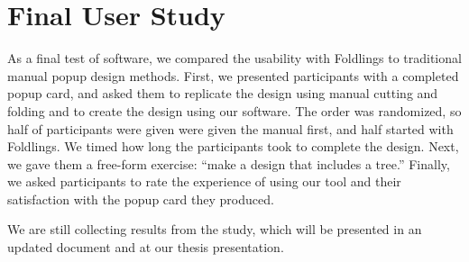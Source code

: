 \section{Final User Study}\label{final-user-study}

As a final test of software, we compared the usability with Foldlings to
traditional manual popup design methods. First, we presented
participants with a completed popup card, and asked them to replicate
the design using manual cutting and folding and to create the design
using our software. The order was randomized, so half of participants
were given were given the manual first, and half started with Foldlings.
We timed how long the participants took to complete the design. Next, we
gave them a free-form exercise: ``make a design that includes a tree.''
Finally, we asked participants to rate the experience of using our tool
and their satisfaction with the popup card they produced.

We are still collecting results from the study, which will be presented
in an updated document and at our thesis presentation.
